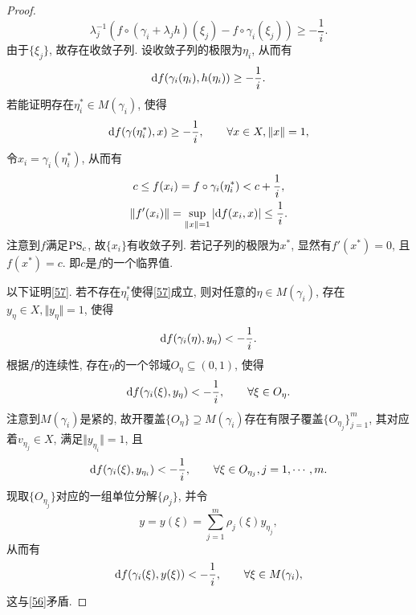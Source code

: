 \begin{theorem}[山路定理]
\begin{proof}
\begin{equation*}
            \lambda_j^{-1}(f \circ (\gamma_i + \lambda_jh)(\xi_j) - f \circ \gamma_i(\xi_j)) \geq -\frac{1}{i}.
        \end{equation*}
        由于$\{\xi_j\}$, 故存在收敛子列. 设收敛子列的极限为$\eta_i$, 从而有 
        \begin{equation}\label{56}
            {\rm d}f(\gamma_i(\eta_i), h(\eta_i)) \geq -\frac{1}{i}.
        \end{equation}
        若能证明存在$\eta_i^* \in M(\gamma_i)$, 使得 
        \begin{equation}\label{57}
            {\rm d}f(\gamma(\eta_i^*), x) \geq -\frac{1}{i}, \qquad \forall x \in X, \Vert x \Vert = 1,
        \end{equation}
        令$x_i = \gamma_i(\eta_i^*)$, 从而有
        \begin{gather*}
            c \leq f(x_i) = f \circ \gamma_i(\eta_i^*) < c + \frac{1}{i}, \\ 
            \Vert f'(x_i)\Vert = \sup_{\Vert x \Vert = 1}|{\rm d}f(x_i, x)| \leq \frac{1}{i}. 
        \end{gather*}
        注意到$f$满足${\rm PS}_c$, 故$\{x_i\}$有收敛子列. 若记子列的极限为$x^*$, 显然有$f'(x^*) = 0$, 且$f(x^*) = c$.
        即$c$是$f$的一个临界值.

        以下证明\eqref{57}. 若不存在$\eta_i^*$使得\eqref{57}成立, 则对任意的$\eta \in M(\gamma_i)$, 存在$y_{\eta} \in X, \Vert y_{\eta}\Vert = 1$, 使得 
        \begin{equation*}
            {\rm d}f(\gamma_i(\eta), y_{\eta}) < -\frac{1}{i}.
        \end{equation*} 
        根据$f$的连续性, 存在$\eta$的一个邻域$O_{\eta} \subseteq (0, 1)$, 使得 
        \begin{equation*}
            {\rm d}f(\gamma_i(\xi), y_{\eta}) < -\frac{1}{i}, \qquad \forall \xi \in O_{\eta}.
        \end{equation*}
        注意到$M(\gamma_i)$是紧的, 故开覆盖$\{O_{\eta}\} \supseteq M(\gamma_i)$存在有限子覆盖$\{O_{\eta_j}\}_{j = 1}^m$, 其对应着$v_{\eta_j} \in X$, 满足$\Vert y_{\eta_i}\Vert = 1$, 且 
        \begin{equation*}
            {\rm d}f(\gamma_i(\xi), y_{\eta_i}) < -\frac{1}{i}, \qquad \forall \xi \in O_{\eta_j}, j = 1, \cdots, m.
        \end{equation*}
        现取$\{O_{\eta_j}\}$对应的一组单位分解$\{\rho_j\}$, 并令
        \begin{equation*}
            y = y(\xi) = \sum_{j = 1}^m\rho_j(\xi)y_{\eta_j},
        \end{equation*}
        从而有 
        \begin{equation*}
            {\rm d}f(\gamma_i(\xi), y(\xi)) < -\frac{1}{i}, \qquad \forall \xi \in M(\gamma_i),
        \end{equation*}
        这与\eqref{56}矛盾.
    \end{proof}
\end{theorem}

